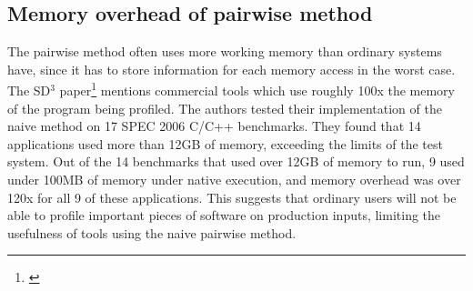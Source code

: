 \documentclass[12pt,twoside]{reedthesis}
\begin{document}
		\subsection{Memory overhead of pairwise method}
		
		The pairwise method often uses more working memory than ordinary systems have, since it has to store information for each memory access in the worst case. The SD$^3$ paper\footnote{\cite{Kim:2010}} mentions commercial tools which use roughly 100x the memory of the program being profiled. The authors tested their implementation of the naive method on 17 SPEC 2006 C/C++ benchmarks. They found that 14 applications used more than 12GB of memory, exceeding the limits of the test system. Out of the 14 benchmarks that used over 12GB of memory to run, 9 used under 100MB of memory under native execution, and memory overhead was over 120x for all 9 of these applications. 
		This suggests that ordinary users will not be able to profile important pieces of software on production inputs, limiting the usefulness of tools using the naive pairwise method.
%		
%		
%		
%		
\end{document}
